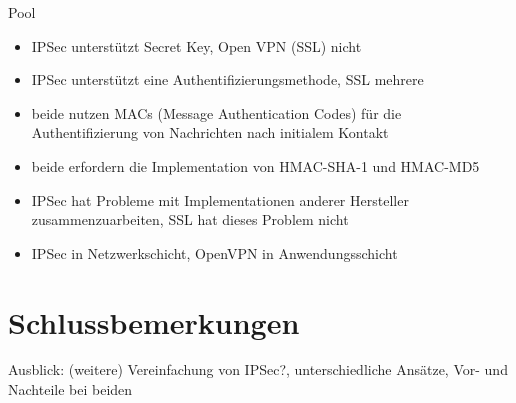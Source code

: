 \documentclass[12pt]{scrartcl}
\begin{document}
Pool
\begin{itemize}
	\item IPSec unterstützt Secret Key\cite{Alshamsi2005}, Open VPN (SSL) nicht
	\item IPSec unterstützt eine Authentifizierungsmethode, SSL mehrere\cite{Alshamsi2005}
	\item beide nutzen MACs (Message Authentication Codes) für die Authentifizierung von Nachrichten nach initialem Kontakt\cite{Alshamsi2005}
	\item beide erfordern die Implementation von HMAC-SHA-1 und HMAC-MD5\cite{Alshamsi2005}
	\item IPSec hat Probleme mit Implementationen anderer Hersteller zusammenzuarbeiten, SSL hat dieses Problem nicht\cite{Alshamsi2005}
	\item IPSec in Netzwerkschicht, OpenVPN in Anwendungsschicht
\end{itemize}
\section{Schlussbemerkungen}
Ausblick: (weitere) Vereinfachung von IPSec?, unterschiedliche Ansätze, Vor- und Nachteile bei beiden

\newpage

\printbibliography
{}


\newpage
{}
\end{document}
